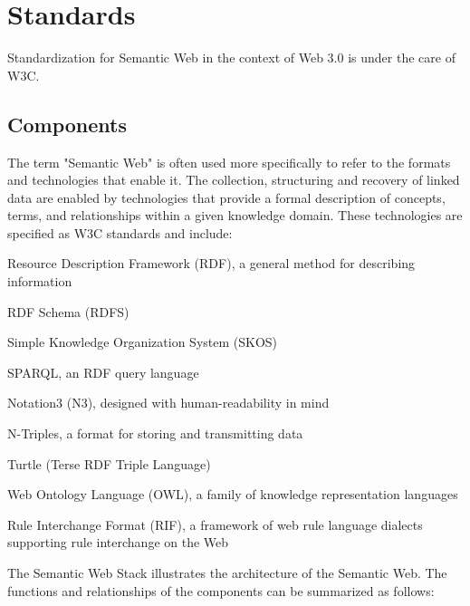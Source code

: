 \section{Standards}

Standardization for Semantic Web in the context of Web 3.0 is under the care of W3C.


\subsection{Components}

The term "Semantic Web" is often used more specifically to refer to the formats and technologies that enable it. The collection, structuring and recovery of linked data are enabled by technologies that provide a formal description of concepts, terms, and relationships within a given knowledge domain. These technologies are specified as W3C standards and include:

\begin{compactitem}
\item Resource Description Framework (RDF), a general method for describing information
\item RDF Schema (RDFS)
\item Simple Knowledge Organization System (SKOS)
\item SPARQL, an RDF query language
\item Notation3 (N3), designed with human-readability in mind
\item N-Triples, a format for storing and transmitting data
\item Turtle (Terse RDF Triple Language)
\item Web Ontology Language (OWL), a family of knowledge representation languages
\item Rule Interchange Format (RIF), a framework of web rule language dialects supporting rule interchange on the Web
\end{compactitem}

The Semantic Web Stack illustrates the architecture of the Semantic Web. The functions and relationships of the components can be summarized as follows:

